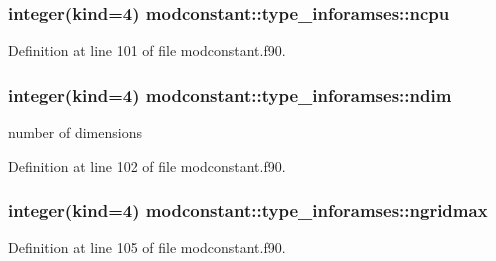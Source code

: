 \subsubsection[{\texorpdfstring{ncpu}{ncpu}}]{\setlength{\rightskip}{0pt plus 5cm}integer(kind=4) modconstant\+::type\+\_\+inforamses\+::ncpu}\hypertarget{structmodconstant_1_1type__inforamses_a7267e8123e67211ef5ce2c51c1974148}{}\label{structmodconstant_1_1type__inforamses_a7267e8123e67211ef5ce2c51c1974148}


Definition at line 101 of file modconstant.\+f90.

\subsubsection[{\texorpdfstring{ndim}{ndim}}]{\setlength{\rightskip}{0pt plus 5cm}integer(kind=4) modconstant\+::type\+\_\+inforamses\+::ndim}\hypertarget{structmodconstant_1_1type__inforamses_adf9bb7fc0490aa3a630c9fd7944148a0}{}\label{structmodconstant_1_1type__inforamses_adf9bb7fc0490aa3a630c9fd7944148a0}


number of dimensions 



Definition at line 102 of file modconstant.\+f90.

\subsubsection[{\texorpdfstring{ngridmax}{ngridmax}}]{\setlength{\rightskip}{0pt plus 5cm}integer(kind=4) modconstant\+::type\+\_\+inforamses\+::ngridmax}\hypertarget{structmodconstant_1_1type__inforamses_a62f64ba9a767a47ca65c383b250c112b}{}\label{structmodconstant_1_1type__inforamses_a62f64ba9a767a47ca65c383b250c112b}


Definition at line 105 of file modconstant.\+f90.

